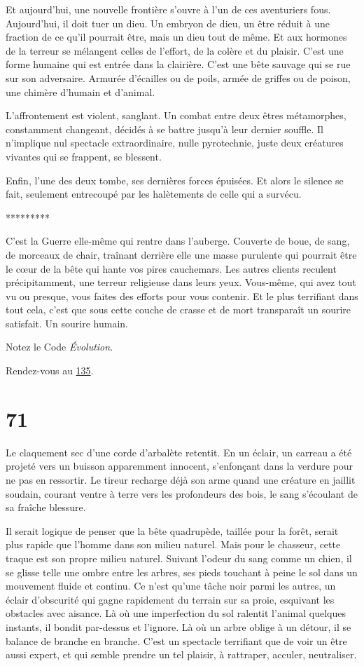 \documentclass{report}
\newcommand{\gsection}[1]{
    \section{#1}
    \label{section-#1}
}
\newcommand{\glink}[1]{\hyperref[section-#1]{#1}}
\newcommand{\ellipse}{
    \begin{center}
        *********
    \end{center}
}
\begin{document}
Et aujourd'hui, une nouvelle frontière s'ouvre à l'un de ces aventuriers fous. Aujourd'hui, il doit tuer un dieu. Un embryon de dieu, un être réduit à une fraction de ce qu'il pourrait être, mais un dieu tout de même. Et aux hormones de la terreur se mélangent celles de l'effort, de la colère et du plaisir.
C'est une forme humaine qui est entrée dans la clairière. C'est une bête sauvage qui se rue sur son adversaire. Armurée d'écailles ou de poils, armée de griffes ou de poison, une chimère d'humain et d'animal.

L'affrontement est violent, sanglant. Un combat entre deux êtres métamorphes, constamment changeant, décidés à se battre jusqu'à leur dernier souffle. Il n'implique nul spectacle extraordinaire, nulle pyrotechnie, juste deux créatures vivantes qui se frappent, se blessent.

Enfin, l'une des deux tombe, ses dernières forces épuisées. Et alors le silence se fait, seulement entrecoupé par les halètements de celle qui a survécu.

\ellipse

C'est la Guerre elle-même qui rentre dans l'auberge. Couverte de boue, de sang, de morceaux de chair, traînant derrière elle une masse purulente qui pourrait être le cœur de la bête qui hante vos pires cauchemars. Les autres clients reculent précipitamment, une terreur religieuse dans leurs yeux. Vous-même, qui avez tout vu ou presque, vous faites des efforts pour vous contenir. Et le plus terrifiant dans tout cela, c'est que sous cette couche de crasse et de mort transparaît un sourire satisfait. Un sourire humain.

Notez le Code \emph{Évolution}.

Rendez-vous au \glink{135}.

\gsection{71}

Le claquement sec d'une corde d'arbalète retentit. En un éclair, un carreau a été projeté vers un buisson apparemment innocent, s'enfonçant dans la verdure pour ne pas en ressortir. Le tireur recharge déjà son arme quand une créature en jaillit soudain, courant ventre à terre vers les profondeurs des bois, le sang s'écoulant de sa fraîche blessure.

Il serait logique de penser que la bête quadrupède, taillée pour la forêt, serait plus rapide que l'homme dans son milieu naturel. Mais pour le chasseur, cette traque est son propre milieu naturel. Suivant l'odeur du sang comme un chien, il se glisse telle une ombre entre les arbres, ses pieds touchant à peine le sol dans un mouvement fluide et continu. Ce n'est qu'une tâche noir parmi les autres, un éclair d'obscurité qui gagne rapidement du terrain sur sa proie, esquivant les obstacles avec aisance. Là où une imperfection du sol ralentit l'animal quelques instants, il bondit par-dessus et l'ignore. Là où un arbre oblige à un détour, il se balance de branche en branche. C'est un spectacle terrifiant que de voir un être aussi expert, et qui semble prendre un tel plaisir, à rattraper, acculer, neutraliser.
\end{document}
